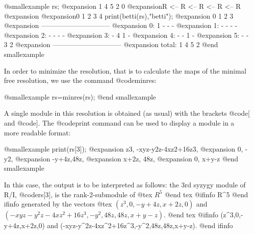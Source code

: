 @smallexample
rs;
@expansion{} 1      4      5      2      0
@expansion{}R  <-- R  <-- R  <-- R  <-- R
@expansion{}
@expansion{}0      1      2      3      4
print(betti(rs),"betti");
@expansion{}            0     1     2     3
@expansion{} ------------------------------
@expansion{}     0:     1     -     -     -
@expansion{}     1:     -     -     -     -
@expansion{}     2:     -     -     -     -
@expansion{}     3:     -     4     1     -
@expansion{}     4:     -     -     1     -
@expansion{}     5:     -     -     3     2
@expansion{} ------------------------------
@expansion{} total:     1     4     5     2
@end smallexample

In order to minimize the resolution, that is to calculate the maps of the minimal 
free resolution, we use the command @code{minres}:

@smallexample
rs=minres(rs);
@end smallexample

A single module in this resolution is obtained (as usual) with the
brackets @code{[} and @code{]}. The @code{print} command can be used to
display a module in a more readable format:

@smallexample
print(rs[3]);
@expansion{} z3,   -xyz-y2z-4xz2+16z3,
@expansion{} 0,    -y2,
@expansion{} -y+4z,48z, 
@expansion{} x+2z, 48z, 
@expansion{} 0,    x+y-z  
@end smallexample

In this case, the output is to be interpreted as follows: the 3rd syzygy
module of R/I, @code{rs[3]}, is the rank-2-submodule of
@tex
$R^5$
@end tex
@ifinfo
R^5
@end ifinfo
generated by the vectors
@tex
$(z^3,0,-y+4z,x+2z,0)$ and $(-xyz-y^2z-4xz^2+16z^3,-y^2,48z,48z,x+y-z)$.
@end tex
@ifinfo
(z^3,0,-y+4z,x+2z,0) and (-xyz-y^2z-4xz^2+16z^3,-y^2,48z,48z,x+y-z).
@end ifinfo


